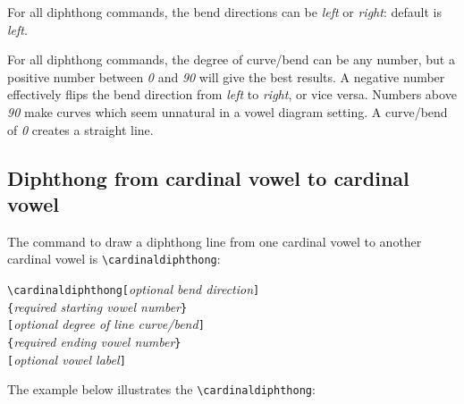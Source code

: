 \documentclass{article}
\begin{document}
For all diphthong commands, the bend directions can be \textit{left} or \textit{right}: default is \textit{left}.  

For all diphthong commands, the degree of curve/bend can be any number, but a positive number between \textit{0} and \textit{90} will give the best results.  A negative number effectively flips the bend direction from \textit{left} to \textit{right}, or vice versa.  Numbers above \textit{90} make curves which seem unnatural in a vowel diagram setting.  A curve/bend of \textit{0} creates a straight line.

\subsection{Diphthong from cardinal vowel to cardinal vowel}
\label{sec:Diphthong from cardinal vowel to cardinal vowel}

The command to draw a diphthong line from one cardinal vowel to another cardinal vowel is \verb|\cardinaldiphthong|:

\medskip
\qquad \verb+\cardinaldiphthong[+\textit{optional bend direction}\verb+]+\\
\qquad\hspace*{12em} \verb+{+\textit{required starting vowel number}\verb+}+\\
\qquad\hspace*{12em} \verb+[+\textit{optional degree of line curve/bend}\verb+]+\\
\qquad\hspace*{12em} \verb+{+\textit{required ending vowel number}\verb+}+\\
\qquad\hspace*{12em} \verb+[+\textit{optional vowel label}\verb+]+\\
\bigskip

\noindent
The example below illustrates the \verb|\cardinaldiphthong|:
\end{document}
